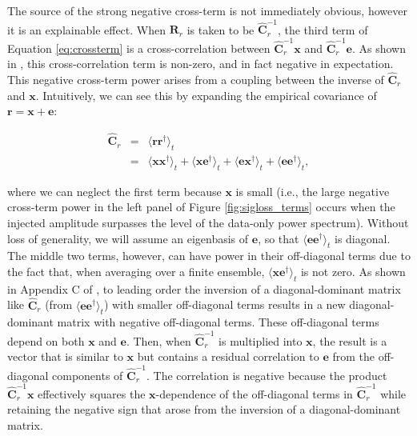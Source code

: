 \documentclass[preprint2,numberedappendix,tighten]{aastex6}  %
\begin{document}
The source of the strong negative cross-term is not immediately obvious, however it is an explainable effect. 
When $\textbf{R}_{r}$
is taken to be $\widehat{\textbf{C}}_{r}^{-1}$, the third term of Equation \eqref{eq:crossterm} is a cross-correlation between $\widehat{\textbf{C}}_{r}^{-1}\textbf{x}$ and
$\widehat{\textbf{C}}_{r}^{-1}\textbf{e}$. As shown in \citet{switzer_et_al2015}, this cross-correlation term is non-zero, and in fact negative in expectation. 
This negative cross-term power arises from a coupling between the inverse of 
$\widehat{\textbf{C}}_{r}$ and $\mathbf{x}$. 
Intuitively, we can see this by expanding the empirical covariance of $\textbf{r}=\textbf{x}+\textbf{e}$:

\begin{eqnarray}
\widehat{\textbf{C}}_{r} &=& \langle \textbf{rr}^{\dagger} \rangle_{t} \nonumber \\ 
&=& \langle \textbf{xx}^{\dagger} \rangle_{t} + \langle \textbf{xe}^{\dagger} \rangle_{t} + \langle \textbf{ex}^{\dagger} \rangle_{t} + \langle 
\textbf{ee}^{\dagger} \rangle_{t},
\end{eqnarray}

\noindent where we can neglect the first term because $\textbf{x}$ is small (i.e., the large negative cross-term power in the left panel of Figure \ref{fig:sigloss_terms} occurs when the injected amplitude surpasses the level of the data-only power spectrum).  Without loss of generality, we will assume
an eigenbasis of $\textbf{e}$, so that $\langle 
\textbf{ee}^{\dagger} \rangle_{t}$ is diagonal. The middle 
two terms, however, can have power in their off-diagonal terms due to the fact that, when averaging over a finite
ensemble, $\langle\textbf{xe}^\dagger\rangle_t$ is not zero.  As shown in Appendix C of \citet{parsons_et_al2014}%
, to leading order the inversion of a diagonal-dominant matrix like $\widehat{\textbf{C}}_{r}$ (from $\langle 
\textbf{ee}^{\dagger} \rangle_{t}$) with smaller
off-diagonal terms results in a new diagonal-dominant matrix with negative off-diagonal terms. These off-diagonal
terms depend on both $\textbf{x}$ and $\textbf{e}$. Then, when $\widehat{\textbf{C}}^{-1}_{r}$ is multiplied into $\textbf{x}$,
the result is a vector that is similar to $\textbf{x}$ but
contains a residual correlation to $\textbf{e}$ from the off-diagonal components of $\widehat{\textbf{C}}^{-1}_{r}$. The
correlation is negative because the product $\widehat{\textbf{C}}_r^{-1}\textbf{x}$ effectively squares the $\textbf{x}$-dependence
of the off-diagonal terms in $\widehat{\textbf{C}}^{-1}_{r}$ while retaining the negative sign that arose from the inversion
of a diagonal-dominant matrix.
\end{document}

